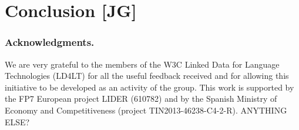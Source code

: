 \documentclass{llncs}
\begin{document}
\section{Conclusion [JG]}
\label{sec:conclusion}

\subsubsection*{Acknowledgments.} We are very grateful to the members of the W3C Linked Data for Language Technologies (LD4LT) for all the useful feedback received and for allowing this initiative to be developed as an activity of the group. This work is supported by the FP7 European project LIDER (610782) and by the Spanish Ministry of Economy and Competitiveness (project TIN2013-46238-C4-2-R). ANYTHING ELSE?




\end{document}
